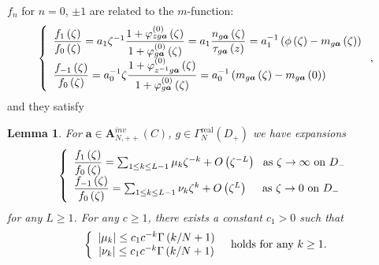 \documentclass[a4paper]{article}%
\newtheorem{lemma}{Lemma}
\begin{document}
$f_{n}$ for $n=0$, $\pm1$ are related to the $m$-function:%
\begin{equation}
\left\{
\begin{array}
[c]{l}%
\dfrac{f_{1}\left(  \zeta\right)  }{f_{0}\left(  \zeta\right)  }=a_{1}%
\zeta^{-1}\dfrac{1+\varphi_{zg\boldsymbol{a}}^{\left(  0\right)  }\left(
\zeta\right)  }{1+\varphi_{g\boldsymbol{a}}^{\left(  0\right)  }\left(
\zeta\right)  }=a_{1}\dfrac{n_{g\boldsymbol{a}}\left(  \zeta\right)  }%
{\tau_{g\boldsymbol{a}}\left(  z\right)  }=a_{1}^{-1}\left(  \phi\left(
\zeta\right)  -m_{g\boldsymbol{a}}\left(  \zeta\right)  \right) \\
\dfrac{f_{-1}\left(  \zeta\right)  }{f_{0}\left(  \zeta\right)  }=a_{0}%
^{-1}\zeta\dfrac{1+\varphi_{z^{-1}g\boldsymbol{a}}^{\left(  0\right)  }\left(
\zeta\right)  }{1+\varphi_{g\boldsymbol{a}}^{\left(  0\right)  }\left(
\zeta\right)  }=a_{0}^{-1}\left(  m_{g\boldsymbol{a}}\left(  \zeta\right)
-m_{g\boldsymbol{a}}\left(  0\right)  \right)
\end{array}
\right.  \text{,} \label{3-10}%
\end{equation}
and they satisfy

\begin{lemma}
\label{l3-4}For $\boldsymbol{a}\in\boldsymbol{A}_{N,++}^{inv}\left(  C\right)
$, $g\in\Gamma_{N}^{\operatorname{real}}\left(  D_{+}\right)  $ we have
expansions%
\begin{equation}
\left\{
\begin{array}
[c]{l}%
\dfrac{f_{1}\left(  \zeta\right)  }{f_{0}\left(  \zeta\right)  }=\sum_{1\leq
k\leq L-1}\mu_{k}\zeta^{-k}+O\left(  \zeta^{-L}\right)  \text{ \ as }%
\zeta\rightarrow\infty\text{ on }D_{-}\\
\dfrac{f_{-1}\left(  \zeta\right)  }{f_{0}\left(  \zeta\right)  }=\sum_{1\leq
k\leq L-1}\nu_{k}\zeta^{k}+O\left(  \zeta^{L}\right)  \text{\ \ \ \ as }%
\zeta\rightarrow0\text{ on }D_{-}%
\end{array}
\right.  \label{3-11}%
\end{equation}
for any $L\geq1$. For any $c\geq1$, there exists a constant $c_{1}>0$ such
that%
\[
\left\{
\begin{array}
[c]{c}%
\left\vert \mu_{k}\right\vert \leq c_{1}c^{-k}\Gamma\left(  k/N+1\right) \\
\left\vert \nu_{k}\right\vert \leq c_{1}c^{-k}\Gamma\left(  k/N+1\right)
\end{array}
\right.  \text{ \ holds for any }k\geq1\text{.}%
\]

\end{lemma}
\end{document}
